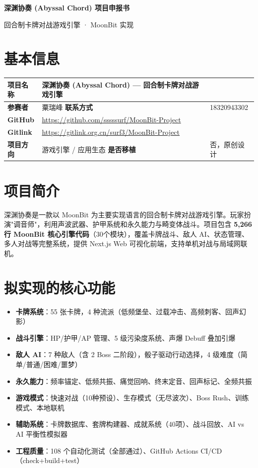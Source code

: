 \documentclass[10pt,a4paper]{article}
\begin{document}
\begin{center}
{\Large\bfseries\color{purpledark} 深渊协奏 (Abyssal Chord) 项目申报书}

\vspace{2pt}
{\small 回合制卡牌对战游戏引擎 · MoonBit 实现}
\end{center}
\vspace{6pt}

\section{基本信息}
\renewcommand{\arraystretch}{1.1}
\begin{tabularx}{\textwidth}{|l|X|}\hline
{} \textbf{项目名称} & 深渊协奏 (Abyssal Chord) — 回合制卡牌对战游戏引擎 \\\hline
\textbf{参赛者} & 粟瑞峰 \hfill \textbf{联系方式} & 18320943302 \\\hline
\textbf{GitHub} & \url{https://github.com/sssssurf/MoonBit-Project} \\\hline
\textbf{Gitlink} & \url{https://gitlink.org.cn/surf3/MoonBit-Project} \\\hline
\textbf{项目方向} & 游戏引擎 / 应用生态 \hfill \textbf{是否移植} & 否，原创设计 \\\hline
\end{tabularx}

\section{项目简介}
深渊协奏是一款以 MoonBit 为主要实现语言的回合制卡牌对战游戏引擎。玩家扮演"调音师"，利用声波武器、护甲系统和永久能力与畸变体战斗。项目包含 \textbf{5,266 行 MoonBit 核心引擎代码}（30个模块），覆盖卡牌战斗、敌人 AI、状态管理、多人对战等完整系统，提供 Next.js Web 可视化前端，支持单机对战与局域网联机。

\section{拟实现的核心功能}
\begin{itemize}[leftmargin=*,nosep]
  \item \textbf{卡牌系统}：55 张卡牌，4 种流派（低频堡垒、过载冲击、高频刺客、回声幻影）
  \item \textbf{战斗引擎}：HP/护甲/AP 管理、5 级污染度系统、声爆 Debuff 叠加引爆
  \item \textbf{敌人 AI}：7 种敌人（含 2 Boss 二阶段），骰子驱动行动选择，4 级难度（简单/普通/困难/噩梦）
  \item \textbf{永久能力}：频率锚定、低频共振、痛觉回响、终末定音、回声标记、全频共振
  \item \textbf{游戏模式}：快速对战（10种预设）、生存模式（无尽波次）、Boss Rush、训练模式、本地联机
  \item \textbf{辅助系统}：卡牌数据库、套牌构建器、成就系统（40项）、战斗回放、AI vs AI 平衡性模拟器
  \item \textbf{工程质量}：108 个自动化测试（全部通过）、GitHub Actions CI/CD（check+build+test）
\end{itemize}
\end{document}
